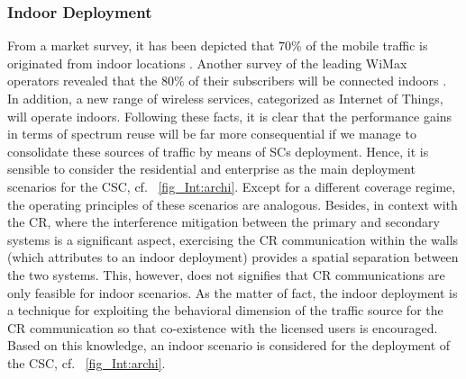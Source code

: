 \subsubsection*{Indoor Deployment}
From a market survey, it has been depicted that $70\%$ of the mobile traffic is originated from indoor locations \cite{Chander08}. Another survey of the leading WiMax operators revealed that the $80\%$ of their subscribers will be connected indoors \cite{Pao07}. In addition, a new range of wireless services, categorized as Internet of Things, will operate indoors. Following these facts, it is clear that the performance gains in terms of spectrum reuse will be far more consequential if we manage to consolidate these sources of traffic by means of SCs deployment. Hence, it is sensible to consider the residential and enterprise as the main deployment scenarios for the CSC, cf. \figurename~\ref{fig_Int:archi}. Except for a different coverage regime, the operating principles of these scenarios are analogous. Besides, in context with the CR, where the interference mitigation between the primary and secondary systems is a significant aspect, exercising the CR communication within the walls (which attributes to an indoor deployment) provides a spatial separation between the two systems. This, however, does not signifies that CR communications are only feasible for indoor scenarios. As the matter of fact, the indoor deployment is a technique for exploiting the behavioral dimension of the traffic source for the CR communication so that co-existence with the licensed users is encouraged. 
Based on this knowledge, an indoor scenario is considered for the deployment of the CSC, cf. \figurename~\ref{fig_Int:archi}.  

